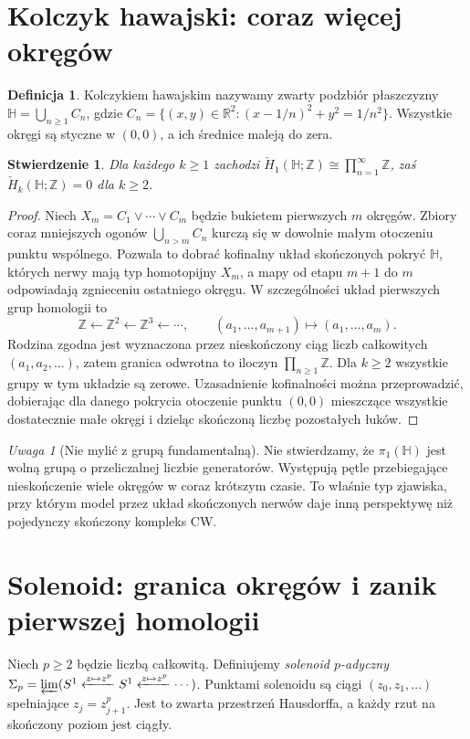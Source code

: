 \documentclass[11pt,a4paper,oneside]{report}
\newcommand{\R}{\mathbb{R}}
\newcommand{\Z}{\mathbb{Z}}
\theoremstyle{plain}
\newtheorem{stwierdzenie}[twierdzenie]{Stwierdzenie}
\theoremstyle{definition}
\newtheorem{definicja}[twierdzenie]{Definicja}
\theoremstyle{remark}
\newtheorem{uwaga}[twierdzenie]{Uwaga}
\begin{document}
\section{Kolczyk hawajski: coraz więcej okręgów}
\begin{definicja}
Kolczykiem hawajskim nazywamy zwarty podzbiór płaszczyzny
$\mathbb H=\bigcup_{n\ge1}C_n$, gdzie
$C_n=\{(x,y)\in\R^2:(x-1/n)^2+y^2=1/n^2\}$.
Wszystkie okręgi są styczne w $(0,0)$, a ich średnice
maleją do zera.
\end{definicja}

\begin{stwierdzenie}
Dla każdego $k\ge1$ zachodzi
$\check H_1(\mathbb H;\Z)\cong\prod_{n=1}^{\infty}\Z$,
zaś $\check H_k(\mathbb H;\Z)=0$ dla $k\ge2$.
\end{stwierdzenie}
\begin{proof}
Niech $X_m=C_1\vee\cdots\vee C_m$ będzie bukietem
pierwszych $m$ okręgów. Zbiory coraz mniejszych ogonów
$\bigcup_{n>m}C_n$ kurczą się w dowolnie małym otoczeniu
punktu wspólnego. Pozwala to dobrać kofinalny układ
skończonych pokryć $\mathbb H$, których nerwy mają typ
homotopijny $X_m$, a mapy od etapu $m+1$ do $m$ odpowiadają
zgnieceniu ostatniego okręgu. W szczególności układ
pierwszych grup homologii to
\[
\Z\longleftarrow\Z^2\longleftarrow\Z^3\longleftarrow\cdots,
\qquad (a_1,\ldots,a_{m+1})\longmapsto(a_1,\ldots,a_m).
\]
Rodzina zgodna jest wyznaczona przez nieskończony ciąg
liczb całkowitych $(a_1,a_2,\ldots)$, zatem granica odwrotna
to iloczyn $\prod_{n\ge1}\Z$. Dla $k\ge2$ wszystkie grupy
w tym układzie są zerowe. Uzasadnienie kofinalności można
przeprowadzić, dobierając dla danego pokrycia otoczenie
punktu $(0,0)$ mieszczące wszystkie dostatecznie małe okręgi
i dzieląc skończoną liczbę pozostałych łuków.
\end{proof}

\begin{uwaga}[Nie mylić z grupą fundamentalną]
Nie stwierdzamy, że $\pi_1(\mathbb H)$ jest wolną grupą o
przeliczalnej liczbie generatorów. Występują pętle
przebiegające nieskończenie wiele okręgów w coraz krótszym
czasie. To właśnie typ zjawiska, przy którym model przez
układ skończonych nerwów daje inną perspektywę niż
pojedynczy skończony kompleks CW.
\end{uwaga}

\section{Solenoid: granica okręgów i zanik pierwszej homologii}
Niech $p\ge2$ będzie liczbą całkowitą. Definiujemy
\emph{solenoid $p$-adyczny}
$\Sigma_p=\varprojlim(S^1\xleftarrow{z\mapsto z^p}S^1
\xleftarrow{z\mapsto z^p}\cdots)$.
Punktami solenoidu są ciągi $(z_0,z_1,\ldots)$ spełniające
$z_j=z_{j+1}^p$. Jest to zwarta przestrzeń Hausdorffa,
a każdy rzut na skończony poziom jest ciągły.
\end{document}
